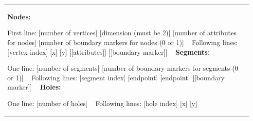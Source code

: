 \tabulinesep=1mm
\begin{longtabu} spread 0pt [c]{*{1}{|X[-1]}|}
\hline
{\bfseries Nodes\+:} 

First line\+: \mbox{[}number of vertices\mbox{]} \mbox{[}dimension (must be 2)\mbox{]} \mbox{[}number of attributes for nodes\mbox{]} \mbox{[}number of boundary markers for nodes (0 or 1)\mbox{]} ~\newline
Following lines\+: \mbox{[}vertex index\mbox{]} \mbox{[}x\mbox{]} \mbox{[}y\mbox{]} \mbox{[}\mbox{[}attributes\mbox{]}\mbox{]} \mbox{[}\mbox{[}boundary marker\mbox{]}\mbox{]} ~\newline
 {\bfseries Segments\+:} 

One line\+: \mbox{[}number of segments\mbox{]} \mbox{[}number of boundary markers for segments (0 or 1)\mbox{]} ~\newline
Following lines\+: \mbox{[}segment index\mbox{]} \mbox{[}endpoint\mbox{]} \mbox{[}endpoint\mbox{]} \mbox{[}\mbox{[}boundary marker\mbox{]}\mbox{]} ~\newline
 {\bfseries Holes\+:} 

One line\+: \mbox{[}number of holes\mbox{]} ~\newline
Following lines\+: \mbox{[}hole index\mbox{]} \mbox{[}x\mbox{]} \mbox{[}y\mbox{]} ~\newline
   \\
\end{longtabu}


